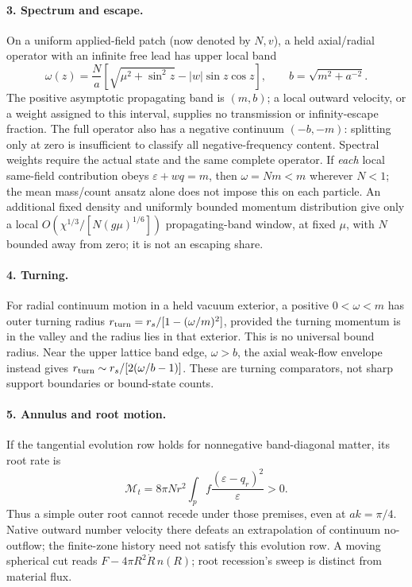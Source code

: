 \documentclass[10pt]{article}
\begin{document}
\paragraph{3. Spectrum and escape.}
On a uniform applied-field patch (now denoted by \(N,v\)), a held
axial/radial operator with an infinite free lead has upper local band
\[
 \omega(z)=\frac Na[\sqrt{\mu^2+\sin^2z}-|w|\sin z\cos z],\qquad
 b=\sqrt{m^2+a^{-2}}.
\]
The positive asymptotic propagating band is \((m,b)\); a local
outward velocity, or a weight assigned to this interval, supplies
no transmission or infinity-escape fraction. The full operator also
has a negative continuum \((-b,-m)\): splitting only at zero is
insufficient to classify all negative-frequency content. Spectral
weights require the actual state and the same complete operator.
If \emph{each} local same-field contribution obeys
\(\varepsilon+wq=m\), then \(\omega=Nm<m\) wherever \(N<1\);
the mean mass/count ansatz alone does not impose this on each particle.
An additional fixed density and uniformly bounded momentum distribution give only a
local \(O(\chi^{1/3}/[N(g\mu)^{1/6}])\) propagating-band window,
at fixed \(\mu\), with \(N\) bounded away from zero;
it is not an escaping share.

\paragraph{4. Turning.}
For radial continuum motion in a held vacuum exterior, a positive
\(0<\omega<m\) has outer turning radius
\(r_{\rm turn}=r_s/[1-(\omega/m)^2]\), provided the turning momentum
is in the valley and the radius lies in that exterior. This is no
universal bound radius. Near the upper lattice band edge,
\(\omega>b\), the axial weak-flow envelope instead gives
\(r_{\rm turn}\sim r_s/[2(\omega/b-1)]\). These are turning
comparators, not sharp support boundaries or bound-state counts.

\paragraph{5. Annulus and root motion.}
If the tangential evolution row holds for nonnegative band-diagonal
matter, its root rate is
\[
 \mathcal M_t=8\pi Nr^2\int_p f\frac{(\varepsilon-q_r)^2}{\varepsilon}>0.
\]
Thus a simple outer root cannot recede under those premises, even
at \(ak=\pi/4\). Native outward number velocity there defeats an
extrapolation of continuum no-outflow; the finite-zone history need
not satisfy this evolution row. A moving spherical cut reads
\(F-4\pi R^2\dot R\,n(R)\);
root recession's sweep is distinct from material flux.
\end{document}
